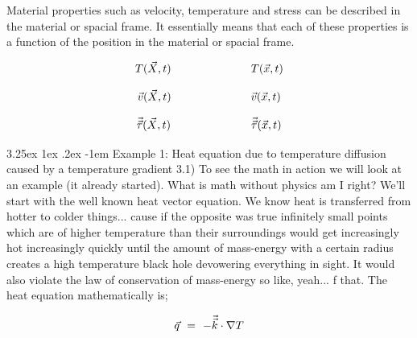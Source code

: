 \documentclass{article}
\makeatletter
\renewcommand\subparagraph{\@startsection{subparagraph}{6}{\parindent}%
  {3.25ex \@plus1ex \@minus .2ex}%
  {-1em}%
  {\normalfont\normalsize\bfseries}}
\makeatother
\begin{document}
Material properties such as velocity, temperature and stress can be described in the material or spacial frame. It essentially means that each of these properties is a function of the position in the material or spacial frame. 

\begin{equation} \label{eb-eq-1-1}
T(\vec{X}, t) \hspace{0.125cm} \hspace{1.125cm} \hspace{1.125cm} \hspace{0.125cm}  T(\vec{x}, t)
\end{equation}

\begin{equation} \label{eb-eq-1-2}
\vec{v}(\vec{X}, t) \hspace{0.125cm} \hspace{1.125cm} \hspace{1.125cm} \hspace{0.125cm}  \vec{v}(\vec{x}, t)
\end{equation}

\begin{equation} \label{eb-eq-1-3}
\vec{\vec{\tau}}(\vec{X}, t) \hspace{0.125cm} \hspace{1.125cm} \hspace{1.125cm} \hspace{0.125cm}  \vec{\vec{\tau}}(\vec{x}, t)
\end{equation}

\subparagraph{Example 1: Heat equation due to temperature diffusion caused by a temperature gradient}
3.1) To see the math in action we will look at an example (it already started). What is math without physics am I right? We'll start with the well known heat vector equation. We know heat is transferred from hotter to colder things... cause if the opposite was true infinitely small points which are of higher temperature than their surroundings would get increasingly hot increasingly quickly until the amount of mass-energy with a certain radius creates a high temperature black hole devowering everything in sight. It would also violate the law of conservation of mass-energy so like, yeah... f that. The heat equation mathematically is;

\begin{equation} \label{eb-eq-1-4}
\vec{q} \hspace{0.125cm} = \hspace{0.125cm} -\vec{\vec{k}} \cdot \nabla{T} 
\end{equation}
\end{document}
